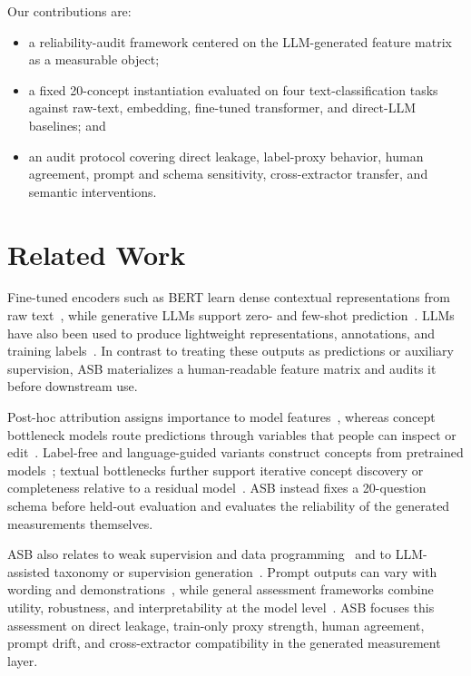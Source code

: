 \documentclass[runningheads]{llncs}
\begin{document}
Our contributions are:

\begin{itemize}
    \item a reliability-audit framework centered on the LLM-generated feature matrix as a measurable object;
    \item a fixed 20-concept instantiation evaluated on four text-classification tasks against raw-text, embedding, fine-tuned transformer, and direct-LLM baselines; and
    \item an audit protocol covering direct leakage, label-proxy behavior, human agreement, prompt and schema sensitivity, cross-extractor transfer, and semantic interventions.
\end{itemize}

\section{Related Work}

Fine-tuned encoders such as BERT learn dense contextual representations from raw text~\cite{devlin2019bert}, while generative LLMs support zero- and few-shot prediction~\cite{brown2020language}. LLMs have also been used to produce lightweight representations, annotations, and training labels~\cite{liu2024llmembed,gilardi2023chatgpt,tan2024large,kumar2026large}. In contrast to treating these outputs as predictions or auxiliary supervision, ASB materializes a human-readable feature matrix and audits it before downstream use.

Post-hoc attribution assigns importance to model features~\cite{zhu2024enhancing,zhu2025narrowing}, whereas concept bottleneck models route predictions through variables that people can inspect or edit~\cite{koh2020concept}. Label-free and language-guided variants construct concepts from pretrained models~\cite{oikarinen2023label,yang2023language,tan2024interpreting,sun2025concept}; textual bottlenecks further support iterative concept discovery or completeness relative to a residual model~\cite{ludan2023interpretable,bhan2025towards}. ASB instead fixes a 20-question schema before held-out evaluation and evaluates the reliability of the generated measurements themselves.

ASB also relates to weak supervision and data programming~\cite{ratner2020snorkel} and to LLM-assisted taxonomy or supervision generation~\cite{wan2024tnt}. Prompt outputs can vary with wording and demonstrations~\cite{zhao2021calibrate,lu2022fantastically,chatterjee2024posix,zhou2024larger}, while general assessment frameworks combine utility, robustness, and interpretability at the model level~\cite{jin2023poster}. ASB focuses this assessment on direct leakage, train-only proxy strength, human agreement, prompt drift, and cross-extractor compatibility in the generated measurement layer.
\end{document}
